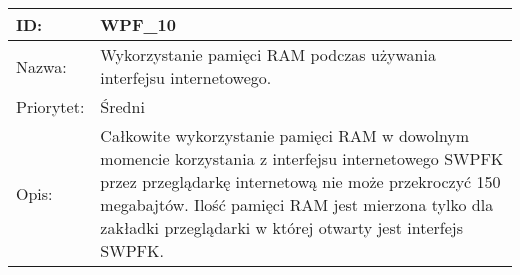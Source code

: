 \begin{center}
\begin{tabular}[h]{|p{1.6cm}|p{13.5cm}|}
\hline
ID: & WPF\_10 \\ \hline
Nazwa: & Wykorzystanie pamięci RAM podczas używania interfejsu internetowego. \\ \hline
Priorytet: & Średni \\ \hline
Opis: & Całkowite wykorzystanie pamięci RAM w dowolnym momencie korzystania z interfejsu internetowego SWPFK przez przeglądarkę internetową nie może przekroczyć 150 megabajtów. Ilość pamięci RAM jest mierzona tylko dla zakładki przeglądarki w której otwarty jest interfejs SWPFK. \\
\hline
\end{tabular}
\end{center}